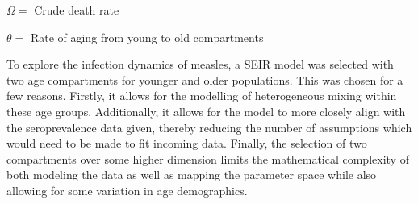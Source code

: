 \documentclass[../Paper.tex]{subfiles}
\begin{document}
 $\Omega = $ Crude death rate \par
 $\theta = $ Rate of aging from young to old compartments \par
\par
\raggedright
To explore the infection dynamics of measles, a SEIR model was selected with two
age compartments for younger and older populations. This was chosen for a few
reasons. Firstly, it allows for the modelling of heterogeneous mixing within
these age groups. Additionally, it allows for the model to more closely
align with the seroprevalence data given, thereby reducing the number of assumptions
which would need to be made to fit incoming data. Finally, the selection of two
compartments over some higher dimension limits the mathematical complexity of both
modeling the data as well as mapping the parameter space while also allowing
for some variation in age demographics.

\clearpage
\end{document}
